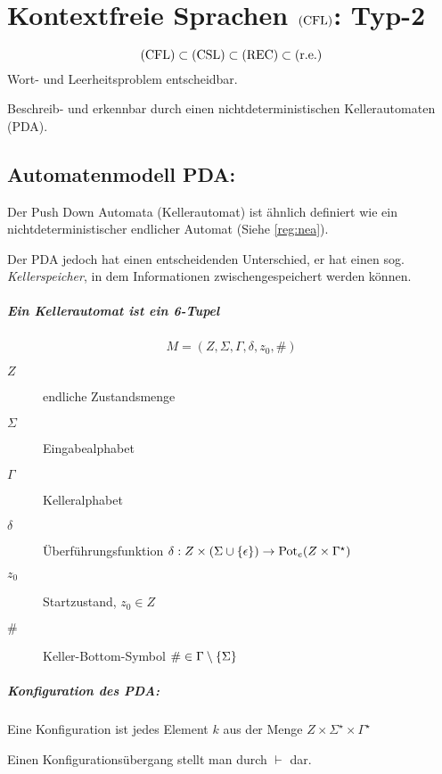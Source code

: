 \chapter{Kontextfreie Sprachen $\mathrm{(CFL)}$: Typ-2}
\begin{equation*}
	\mathrm{(CFL)}\subset\mathrm{(CSL)}\subset\mathrm{(REC)}\subset\mathrm{(r.e.)}
\end{equation*}
Wort- und Leerheitsproblem entscheidbar.

Beschreib- und erkennbar durch einen nichtdeterministischen Kellerautomaten (PDA).
\section{Automatenmodell PDA:}
Der Push Down Automata (Kellerautomat) ist ähnlich definiert wie ein nichtdeterministischer endlicher Automat (Siehe \autoref{reg:nea}).

Der PDA jedoch hat einen entscheidenden Unterschied, er hat einen sog. \emph{Kellerspeicher}, in dem Informationen zwischengespeichert werden können.

\paragraph{Ein Kellerautomat ist ein 6-Tupel}
\begin{equation*}
	M=(Z,\Sigma,\Gamma,\delta,z_0,\#)
\end{equation*}
\begin{description}
	\item[$Z$] endliche Zustandsmenge
	\item[$\Sigma$] Eingabealphabet
	\item[$\Gamma$] Kelleralphabet
	\item[$\delta$] Überführungsfunktion $\delta:Z\times(\Sigma\cup\left\{ \epsilon \right\})\rightarrow \mathrm{Pot}_e(Z\times\Gamma^\star)$
	\item[$z_0$] Startzustand, $z_0\in Z$
	\item[$\#$] Keller-Bottom-Symbol $\#\in \Gamma\setminus\left\{ \Sigma \right\}$
\end{description}

\paragraph{Konfiguration des PDA: }
Eine Konfiguration ist jedes Element $k$ aus der Menge $Z\times\Sigma^\star\times\Gamma^\star$

Einen Konfigurationsübergang stellt man durch $\vdash$ dar.

